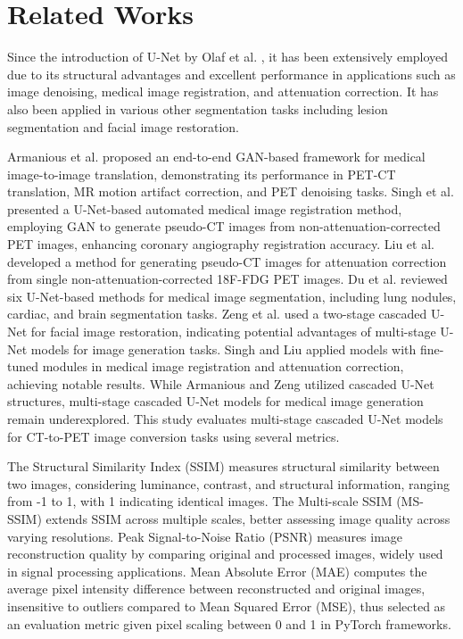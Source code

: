 \documentclass[twocolumn]{article}
\begin{document}
\section{Related Works}
Since the introduction of U-Net by Olaf et al. \cite{navab_u-net_2015}, it has been extensively employed due to its structural advantages and excellent performance in applications such as image denoising, medical image registration, and attenuation correction. It has also been applied in various other segmentation tasks including lesion segmentation and facial image restoration.

Armanious et al. \cite{armanious_medgan_2020} proposed an end-to-end GAN-based framework for medical image-to-image translation, demonstrating its performance in PET-CT translation, MR motion artifact correction, and PET denoising tasks. Singh et al. \cite{singh_automated_2023} presented a U-Net-based automated medical image registration method, employing GAN to generate pseudo-CT images from non-attenuation-corrected PET images, enhancing coronary angiography registration accuracy. Liu et al. \cite{liu_deep_2018} developed a method for generating pseudo-CT images for attenuation correction from single non-attenuation-corrected 18F-FDG PET images. Du et al. \cite{du_medical_2020} reviewed six U-Net-based methods for medical image segmentation, including lung nodules, cardiac, and brain segmentation tasks. Zeng et al. \cite{zeng_swin-casunet_2022} used a two-stage cascaded U-Net for facial image restoration, indicating potential advantages of multi-stage U-Net models for image generation tasks. Singh and Liu applied models with fine-tuned modules in medical image registration and attenuation correction, achieving notable results. While Armanious and Zeng utilized cascaded U-Net structures, multi-stage cascaded U-Net models for medical image generation remain underexplored. This study evaluates multi-stage cascaded U-Net models for CT-to-PET image conversion tasks using several metrics.

The Structural Similarity Index (SSIM) measures structural similarity between two images, considering luminance, contrast, and structural information, ranging from -1 to 1, with 1 indicating identical images. The Multi-scale SSIM (MS-SSIM) extends SSIM across multiple scales, better assessing image quality across varying resolutions. Peak Signal-to-Noise Ratio (PSNR) measures image reconstruction quality by comparing original and processed images, widely used in signal processing applications. Mean Absolute Error (MAE) computes the average pixel intensity difference between reconstructed and original images, insensitive to outliers compared to Mean Squared Error (MSE), thus selected as an evaluation metric given pixel scaling between 0 and 1 in PyTorch frameworks.
\end{document}
